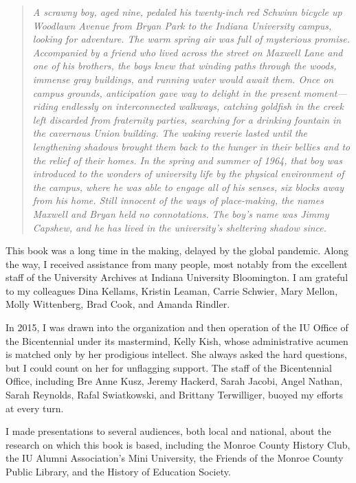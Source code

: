\documentclass[
  american,
  letterpaper,
]{scrreprt}
\newenvironment{anecdote}
  {\begin{quote}\itshape}
  {\end{quote}}
\begin{document}
\begin{anecdote}
A scrawny boy, aged nine, pedaled his twenty-inch red Schwinn bicycle up Woodlawn Avenue from Bryan Park to the Indiana University campus, looking for adventure. The warm spring air was full of mysterious promise. Accompanied by a friend who lived across the street on Maxwell Lane and one of his brothers, the boys knew that winding paths through the woods, immense gray buildings, and running water would await them. Once on campus grounds, anticipation gave way to delight in the present moment---riding endlessly on interconnected walkways, catching goldfish in the creek left discarded from fraternity parties, searching for a drinking fountain in the cavernous Union building. The waking reverie lasted until the lengthening shadows brought them back to the hunger in their bellies and to the relief of their homes. In the spring and summer of 1964, that boy was introduced to the wonders of university life by the physical environment of the campus, where he was able to engage all of his senses, six blocks away from his home. Still innocent of the ways of place-making, the names Maxwell and Bryan held no connotations. The boy's name was Jimmy Capshew, and he has lived in the university's sheltering shadow since.
\end{anecdote}

This book was a long time in the making, delayed by the global pandemic.
Along the way, I received assistance from many people, most notably from
the excellent staff of the University Archives at Indiana University
Bloomington. I am grateful to my colleagues Dina Kellams, Kristin
Leaman, Carrie Schwier, Mary Mellon, Molly Wittenberg, Brad Cook, and
Amanda Rindler.

In 2015, I was drawn into the organization and then operation of the IU
Office of the Bicentennial under its mastermind, Kelly Kish, whose
administrative acumen is matched only by her prodigious intellect. She
always asked the hard questions, but I could count on her for unflagging
support. The staff of the Bicentennial Office, including Bre Anne Kusz,
Jeremy Hackerd, Sarah Jacobi, Angel Nathan, Sarah Reynolds, Rafal
Swiatkowski, and Brittany Terwilliger, buoyed my efforts at every turn.

I made presentations to several audiences, both local and national,
about the research on which this book is based, including the Monroe
County History Club, the IU Alumni Association's Mini University, the
Friends of the Monroe County Public Library, and the History of
Education Society.
\end{document}
